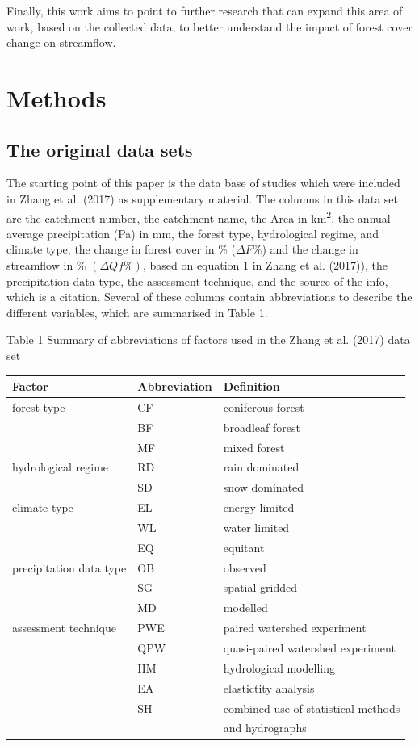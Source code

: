\documentclass[]{elsarticle} %
\begin{document}
Finally, this work aims to point to further research that can expand this area of work, based on the collected data, to better understand the impact of forest cover change on streamflow.

\hypertarget{methods}{%
\section{Methods}\label{methods}}

\hypertarget{the-original-data-sets}{%
\subsection{The original data sets}\label{the-original-data-sets}}

The starting point of this paper is the data base of studies which were included in Zhang et al. (2017) as supplementary material. The columns in this data set are the catchment number, the catchment name, the Area in km\textsuperscript{2}, the annual average precipitation (Pa) in mm, the forest type, hydrological regime, and climate type, the change in forest cover in \% (\(\Delta F\%\)) and the change in streamflow in \% \((\Delta Qf\%)\), based on equation 1 in Zhang et al. (2017)), the precipitation data type, the assessment technique, and the source of the info, which is a citation.
Several of these columns contain abbreviations to describe the different variables, which are summarised in Table 1.

Table 1 Summary of abbreviations of factors used in the Zhang et al. (2017) data set

\begin{longtable}[]{@{}lll@{}}
\toprule
Factor & Abbreviation & Definition \\
\midrule
\endhead
forest type & CF & coniferous forest \\
& BF & broadleaf forest \\
& MF & mixed forest \\
hydrological regime & RD & rain dominated \\
& SD & snow dominated \\
climate type & EL & energy limited \\
& WL & water limited \\
& EQ & equitant \\
precipitation data type & OB & observed \\
& SG & spatial gridded \\
& MD & modelled \\
assessment technique & PWE & paired watershed experiment \\
& QPW & quasi-paired watershed experiment \\
& HM & hydrological modelling \\
& EA & elastictity analysis \\
& SH & combined use of statistical methods \\
& & and hydrographs \\
\bottomrule
\end{longtable}
\end{document}
